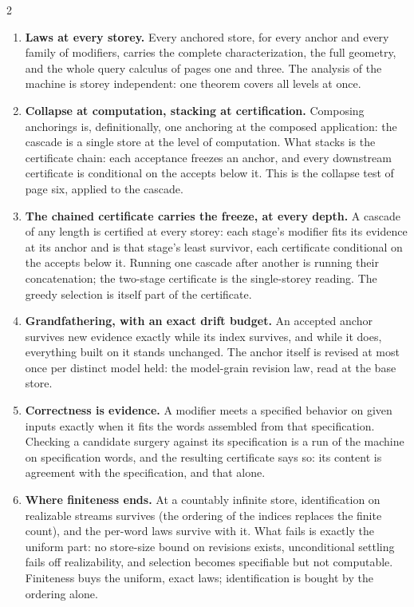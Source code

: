 \documentclass[10pt,a4paper]{article}
\begin{document}
\begin{multicols}{2}
\begin{enumerate}[label=\textbf{M\arabic*.},leftmargin=2.1em,itemsep=0.7pt,parsep=0pt]
\item \textbf{Laws at every storey.} Every anchored store, for every anchor and every family of modifiers, carries the complete characterization, the full geometry, and the whole query calculus of pages one and three. The analysis of the machine is storey independent: one theorem covers all levels at once.
\item \textbf{Collapse at computation, stacking at certification.} Composing anchorings is, definitionally, one anchoring at the composed application: the cascade is a single store at the level of computation. What stacks is the certificate chain: each acceptance freezes an anchor, and every downstream certificate is conditional on the accepts below it. This is the collapse test of page six, applied to the cascade.
\item \textbf{The chained certificate carries the freeze, at every depth.} A cascade of any length is certified at every storey: each stage's modifier fits its evidence at its anchor and is that stage's least survivor, each certificate conditional on the accepts below it. Running one cascade after another is running their concatenation; the two-stage certificate is the single-storey reading. The greedy selection is itself part of the certificate.
\item \textbf{Grandfathering, with an exact drift budget.} An accepted anchor survives new evidence exactly while its index survives, and while it does, everything built on it stands unchanged. The anchor itself is revised at most once per distinct model held: the model-grain revision law, read at the base store.
\item \textbf{Correctness is evidence.} A modifier meets a specified behavior on given inputs exactly when it fits the words assembled from that specification. Checking a candidate surgery against its specification is a run of the machine on specification words, and the resulting certificate says so: its content is agreement with the specification, and that alone.
\item \textbf{Where finiteness ends.} At a countably infinite store, identification on realizable streams survives (the ordering of the indices replaces the finite count), and the per-word laws survive with it. What fails is exactly the uniform part: no store-size bound on revisions exists, unconditional settling fails off realizability, and selection becomes specifiable but not computable. Finiteness buys the uniform, exact laws; identification is bought by the ordering alone.
\end{enumerate}
\end{multicols}
\end{document}
